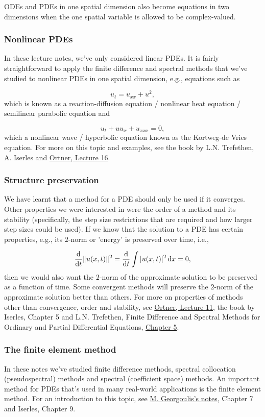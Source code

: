 \documentclass[12pt,a4paper]{article}
\begin{document}
ODEs and PDEs in one spatial dimension also become equations in two dimensions when the one spatial variable is allowed to be complex-valued.

\subsubsection{Nonlinear PDEs}
In these lecture notes, we've only considered linear PDEs.  It is fairly straightforward to apply the finite difference and spectral methods that we've studied to nonlinear PDEs in one spatial dimension, e.g., equations such as

\[
u_t = u_{xx} + u^2,
\]
which is known as a reaction-diffusion equation / nonlinear heat equation / semilinear parabolic equation and

\[
u_t + uu_x + u_{xxx} = 0,
\]
which a nonlinear wave / hyperbolic equation known as the Kortweg-de Vries equation.  For more on this topic and examples, see the book by L.N. Trefethen, A. Iserles and \href{https://github.com/cortner/math405_2022/blob/main/notes/L16-SpectralMethods-BVPs.ipynb}{Ortner, Lecture 16}.

\subsubsection{Structure preservation}
We have learnt that a method for a PDE should only be used if it converges.  Other properties we were interested in were the order of a method and its stability (specifically, the step size restrictions that are required and how larger step sizes could be used).  If we know that the solution to a PDE has certain properties, e.g., its $2$-norm or 'energy'  is preserved over time, i.e.,

\[
\frac{{\rm d}}{{\rm d}t} \| u(x,t) \|^2 = \frac{{\rm d}}{{\rm d}t} \int \vert u(x,t)\vert^2 \,{\rm d}x = 0, 
\]
then we would also want the $2$-norm of the approximate solution to be preserved as a function of time.  Some convergent methods will preserve the $2$-norm of the approximate solution better than others.  For more on properties of methods other than convergence, order and stability, see \href{https://github.com/cortner/math405_2022/blob/main/notes/L11-IVPs-Hamiltonian.ipynb}{Ortner, Lecture 11}, the book by Iserles, Chapter 5 and L.N. Trefethen, Finite Difference and Spectral Methods for Ordinary and Partial Differential Equations, \href{https://people.maths.ox.ac.uk/trefethen/pdetext.html}{Chapter 5}. 

\subsubsection{The finite element method}
In these notes we've studied finite difference methods, spectral collocation (pseudospectral) methods and spectral (coefficient space) methods. An important method for PDEs that's used in many real-world applications is the finite element method.  For an introduction to this topic, see \href{http://users.math.uoc.gr/~tsogka/Courses/AEMDE-fall2015/Biblio/Georgoulis_notes_new.pdf}{M. Georgoulis's notes}, Chapter 7 and Iserles, Chapter 9.   
\end{document}
